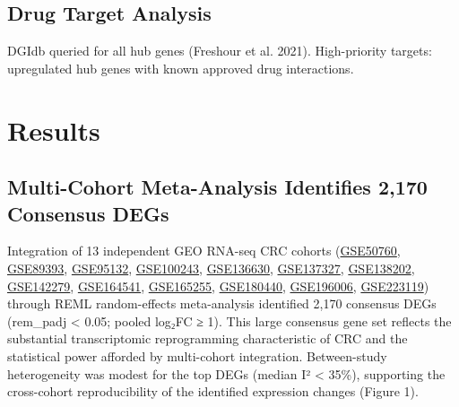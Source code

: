 \documentclass[
  12pt,
]{article}
\begin{document}
\subsection{Drug Target Analysis}\label{drug-target-analysis}

DGIdb queried for all hub genes (Freshour et al. 2021). High-priority
targets: upregulated hub genes with known approved drug interactions.

\section{Results}\label{results}

\subsection{Multi-Cohort Meta-Analysis Identifies 2,170 Consensus
DEGs}\label{multi-cohort-meta-analysis-identifies-2170-consensus-degs}

Integration of 13 independent GEO RNA-seq CRC cohorts
(\href{https://www.ncbi.nlm.nih.gov/geo/query/acc.cgi?acc=GSE50760}{GSE50760},
\href{https://www.ncbi.nlm.nih.gov/geo/query/acc.cgi?acc=GSE89393}{GSE89393},
\href{https://www.ncbi.nlm.nih.gov/geo/query/acc.cgi?acc=GSE95132}{GSE95132},
\href{https://www.ncbi.nlm.nih.gov/geo/query/acc.cgi?acc=GSE100243}{GSE100243},
\href{https://www.ncbi.nlm.nih.gov/geo/query/acc.cgi?acc=GSE136630}{GSE136630},
\href{https://www.ncbi.nlm.nih.gov/geo/query/acc.cgi?acc=GSE137327}{GSE137327},
\href{https://www.ncbi.nlm.nih.gov/geo/query/acc.cgi?acc=GSE138202}{GSE138202},
\href{https://www.ncbi.nlm.nih.gov/geo/query/acc.cgi?acc=GSE142279}{GSE142279},
\href{https://www.ncbi.nlm.nih.gov/geo/query/acc.cgi?acc=GSE164541}{GSE164541},
\href{https://www.ncbi.nlm.nih.gov/geo/query/acc.cgi?acc=GSE165255}{GSE165255},
\href{https://www.ncbi.nlm.nih.gov/geo/query/acc.cgi?acc=GSE180440}{GSE180440},
\href{https://www.ncbi.nlm.nih.gov/geo/query/acc.cgi?acc=GSE196006}{GSE196006},
\href{https://www.ncbi.nlm.nih.gov/geo/query/acc.cgi?acc=GSE223119}{GSE223119})
through REML random-effects meta-analysis identified 2,170 consensus
DEGs (rem\_padj \textless{} 0.05; \textbar pooled log₂FC\textbar{} ≥ 1).
This large consensus gene set reflects the substantial transcriptomic
reprogramming characteristic of CRC and the statistical power afforded
by multi-cohort integration. Between-study heterogeneity was modest for
the top DEGs (median I² \textless{} 35\%), supporting the cross-cohort
reproducibility of the identified expression changes (Figure 1).
\end{document}
